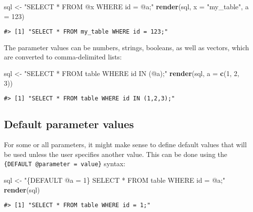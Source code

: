 \documentclass[
]{article}
\newenvironment{Shaded}{\begin{snugshade}}{\end{snugshade}}
\newcommand{\DataTypeTok}[1]{\textcolor[rgb]{0.13,0.29,0.53}{#1}}
\newcommand{\DecValTok}[1]{\textcolor[rgb]{0.00,0.00,0.81}{#1}}
\newcommand{\KeywordTok}[1]{\textcolor[rgb]{0.13,0.29,0.53}{\textbf{#1}}}
\newcommand{\NormalTok}[1]{#1}
\newcommand{\StringTok}[1]{\textcolor[rgb]{0.31,0.60,0.02}{#1}}
\begin{document}
\begin{Shaded}
\begin{Highlighting}[]
\NormalTok{sql <-}\StringTok{ "SELECT * FROM @x WHERE id = @a;"}
\KeywordTok{render}\NormalTok{(sql, }\DataTypeTok{x =} \StringTok{"my_table"}\NormalTok{, }\DataTypeTok{a =} \DecValTok{123}\NormalTok{)}
\end{Highlighting}
\end{Shaded}

\begin{verbatim}
#> [1] "SELECT * FROM my_table WHERE id = 123;"
\end{verbatim}

The parameter values can be numbers, strings, booleans, as well as
vectors, which are converted to comma-delimited lists:

\begin{Shaded}
\begin{Highlighting}[]
\NormalTok{sql <-}\StringTok{ "SELECT * FROM table WHERE id IN (@a);"}
\KeywordTok{render}\NormalTok{(sql, }\DataTypeTok{a =} \KeywordTok{c}\NormalTok{(}\DecValTok{1}\NormalTok{, }\DecValTok{2}\NormalTok{, }\DecValTok{3}\NormalTok{))}
\end{Highlighting}
\end{Shaded}

\begin{verbatim}
#> [1] "SELECT * FROM table WHERE id IN (1,2,3);"
\end{verbatim}

\hypertarget{default-parameter-values}{%
\subsection{Default parameter values}\label{default-parameter-values}}

For some or all parameters, it might make sense to define default values
that will be used unless the user specifies another value. This can be
done using the \texttt{\{DEFAULT\ @parameter\ =\ value\}} syntax:

\begin{Shaded}
\begin{Highlighting}[]
\NormalTok{sql <-}\StringTok{ "\{DEFAULT @a = 1\} SELECT * FROM table WHERE id = @a;"}
\KeywordTok{render}\NormalTok{(sql)}
\end{Highlighting}
\end{Shaded}

\begin{verbatim}
#> [1] "SELECT * FROM table WHERE id = 1;"
\end{verbatim}
\end{document}
